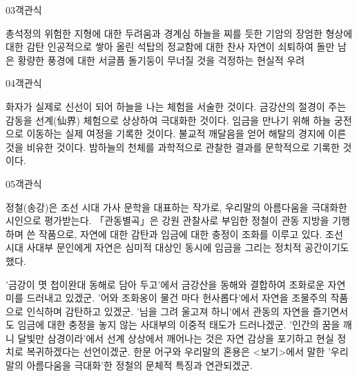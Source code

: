 \documentclass[fs85,seriesWit]{korfarm-base}
\begin{document}
\begin{kfQBlock}{03}{객관식}
\begin{kfChoices}
\kfChoice 총석정의 위험한 지형에 대한 두려움과 경계심
\kfChoice 하늘을 찌를 듯한 기암의 장엄한 형상에 대한 감탄
\kfChoice 인공적으로 쌓아 올린 석탑의 정교함에 대한 찬사
\kfChoice 자연이 쇠퇴하여 돌만 남은 황량한 풍경에 대한 서글픔
\kfChoice 돌기둥이 무너질 것을 걱정하는 현실적 우려
\end{kfChoices}
\end{kfQBlock}

\begin{kfQBlock}{04}{객관식}
\begin{kfChoices}
\kfChoice 화자가 실제로 신선이 되어 하늘을 나는 체험을 서술한 것이다.
\kfChoice 금강산의 절경이 주는 감동을 선계(仙界) 체험으로 상상하여 극대화한 것이다.
\kfChoice 임금을 만나기 위해 하늘 궁전으로 이동하는 실제 여정을 기록한 것이다.
\kfChoice 불교적 깨달음을 얻어 해탈의 경지에 이른 것을 비유한 것이다.
\kfChoice 밤하늘의 천체를 과학적으로 관찰한 결과를 문학적으로 기록한 것이다.
\end{kfChoices}
\end{kfQBlock}

\begin{kfQBlock}{05}{객관식}
\begin{kfEvidence}정철(송강)은 조선 시대 가사 문학을 대표하는 작가로, 우리말의 아름다움을 극대화한 시인으로 평가받는다. 「관동별곡」은 강원 관찰사로 부임한 정철이 관동 지방을 기행하며 쓴 작품으로, 자연에 대한 감탄과 임금에 대한 충정이 조화를 이루고 있다. 조선 시대 사대부 문인에게 자연은 심미적 대상인 동시에 임금을 그리는 정치적 공간이기도 했다.\end{kfEvidence}
\begin{kfChoices}
\kfChoice '금강이 몃 첩이완대 동해로 담아 두고'에서 금강산을 동해와 결합하여 조화로운 자연미를 드러내고 있겠군.
\kfChoice '어와 조화옹이 물건 마다 헌사롭다'에서 자연을 조물주의 작품으로 인식하며 감탄하고 있겠군.
\kfChoice '님을 그려 울고져 하니'에서 관동의 자연을 즐기면서도 임금에 대한 충정을 놓지 않는 사대부의 이중적 태도가 드러나겠군.
\kfChoice '인간의 꿈을 깨니 달빛만 삼경이라'에서 선계 상상에서 깨어나는 것은 자연 감상을 포기하고 현실 정치로 복귀하겠다는 선언이겠군.
\kfChoice 한문 어구와 우리말의 혼용은 <보기>에서 말한 '우리말의 아름다움을 극대화'한 정철의 문체적 특징과 연관되겠군.
\end{kfChoices}
\end{kfQBlock}
\end{document}
